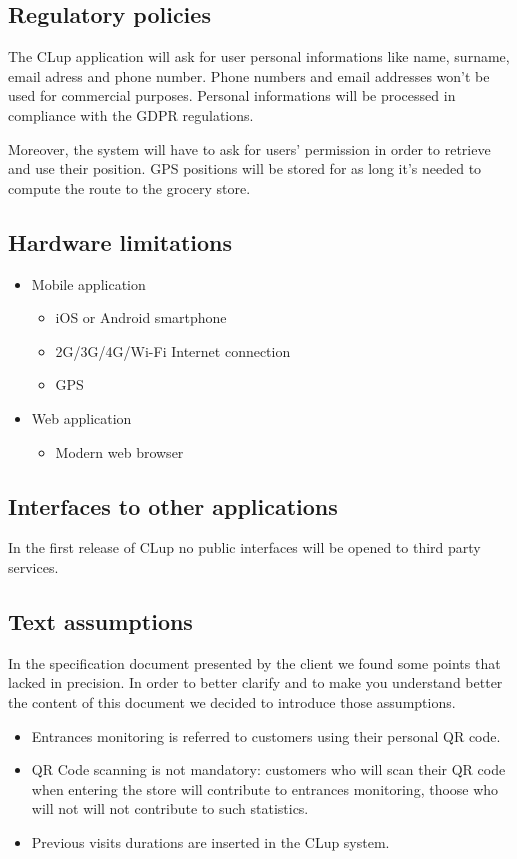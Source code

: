 \subsection{Regulatory policies}
The CLup application will ask for user personal informations like name, surname, email adress and phone number. Phone numbers and email addresses won't be used for commercial purposes.
Personal informations will be processed in compliance with the GDPR regulations.

Moreover, the system will have to ask for users' permission in order to retrieve and use their position. GPS positions will be stored for as long it's needed to compute the route to the grocery store.

\subsection{Hardware limitations}
\begin{itemize}
    \item Mobile application
    \begin{itemize}
        \item iOS or Android smartphone
        \item 2G/3G/4G/Wi-Fi Internet connection
        \item GPS
    \end{itemize}
    \item Web application
    \begin{itemize}
        \item Modern web browser
    \end{itemize}
\end{itemize}

\subsection{Interfaces to other applications}
In the first release of CLup no public interfaces will be opened to third party services.

\subsection{Text assumptions}
In the specification document presented by the client we found some points that lacked in precision. In order to better clarify and to make you understand better the content of this document we decided to introduce those assumptions.
\begin{itemize}
    \item Entrances monitoring is referred to customers using their personal QR code.
    \item QR Code scanning is not mandatory: customers who will scan their QR code when entering the store will contribute to entrances monitoring, thoose who will not will not contribute to such statistics.
    \item Previous visits durations are inserted in the CLup system.
\end{itemize}


